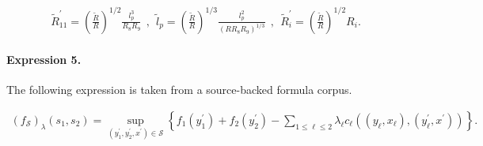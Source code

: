 \documentclass[11pt]{article}
\begin{document}
\begin{align*}\tilde{R}_{11}^{\prime} = \left( \frac{\tilde{R}}{R} \right)^{1/2} \frac{l_p^3}{R_8 R_9} \ \ , \ \ \tilde{l}_p = \left( \frac{\tilde{R}}{R} \right)^{1/3} \frac{l_p^2}{(R R_8 R_9 )^{1/3}} \ \ , \ \ \tilde{R}_i^{\prime} = \left( \frac{\tilde{R}}{R} \right)^{1/2} R_i . \end{align*}

\paragraph{Expression 5.} The following expression is taken from a source-backed formula corpus.

\begin{align*}\left(f_{\mathcal{S}}\right)_\lambda(s_1, s_2) = \sup_{ (y_1^\prime, y_2^\prime, x^\prime ) \in \mathcal{S} } \left\{ f_1(y_1^\prime) + f_2(y_2^\prime) - \sum_{1 \leq \ell \leq 2} \lambda_\ell c_\ell\left( (y_\ell, x_\ell), (y^\prime_\ell, x^\prime) \right) \right\}.\end{align*}
\end{document}
